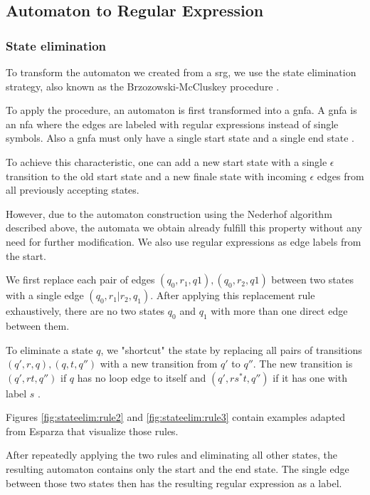 \subsection{Automaton to Regular Expression}

\subsubsection{State elimination}

To transform the automaton we created from a \ac{srg}, we use the state elimination strategy, also known as the Brzozowski-McCluskey procedure \cite{brzozowksi_mccluskey}.

To apply the procedure, an automaton is first transformed into a \ac{gnfa}. A \ac{gnfa} is an \ac{nfa} where the edges are labeled with regular expressions instead of single symbols.
Also a \ac{gnfa} must only have a single start state and a single end state \cite{hanGNFA}.

To achieve this characteristic, one can add a new start state with a single $\epsilon$ transition to the old start state and a new finale state with incoming $\epsilon$ edges from all previously accepting states.

However, due to the automaton construction using the Nederhof algorithm described above, the automata we obtain already fulfill this property without any need for further modification.
We also use regular expressions as edge labels from the start.


We first replace each pair of edges $(q_0, r_1, q1), (q_0, r_2, q1)$ between two states with a single edge $(q_0, r_1|r_2, q_1)$.
After applying this replacement rule exhaustively, there are no two states $q_0$ and $q_1$ with more than one direct edge between them.

To eliminate a state $q$, we "shortcut" the state by replacing all pairs of transitions $(q',r, q), (q, t, q'')$ with a new transition from $q'$ to $q''$.
The new transition is $(q', rt, q'')$ if $q$ has no loop edge to itself and $(q', rs^*t, q'')$ if it has one with label $s$ \cite{esparza}.

Figures \ref{fig:stateelim:rule2} and \ref{fig:stateelim:rule3} contain examples adapted from Esparza \cite{esparza} that visualize those rules.

After repeatedly applying the two rules and eliminating all other states, the resulting automaton contains only the start and the end state. The single edge between those two states then has the resulting regular expression as a label.

